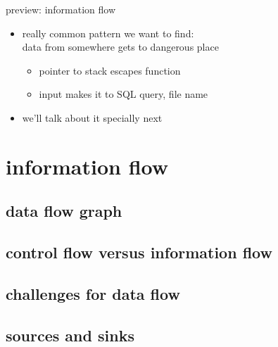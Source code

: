 \begin{frame}{preview: information flow}
    \begin{itemize}
    \item really common pattern we want to find: \\
        data from somewhere gets to dangerous place
        \begin{itemize}
        \item pointer to stack escapes function
        \item input makes it to SQL query, file name
        \end{itemize}
    \item we'll talk about it specially next
    \end{itemize}
\end{frame}

\section{information flow}


\subsection{data flow graph}


\subsection{control flow versus information flow} 


\subsection{challenges for data flow}


\subsection{sources and sinks}


